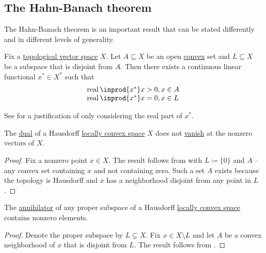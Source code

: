 \subsection{The Hahn-Banach theorem}\label{subsec:hahn_banach}

The Hahn-Banach theorem is an important result that can be stated differently and in different levels of generality.

\begin{theorem}\label{thm:geometric_hahn_banach}\mcite\cite[24]{Йоффе1974}
  Fix a \hyperref[def:topological_vector_space]{topological vector space} \( X \). Let \( A \subseteq X \) be an open \hyperref[def:convex_set]{convex} set and \( L \subseteq X \) be a subspace that is disjoint from \( A \). Then there exists a continuous linear functional \( x^* \in X^* \) such that
  \begin{equation*}
    \begin{array}{l}
      \real \inprod{x^*} x > 0, x \in A \\
      \real \inprod{x^*} x = 0, x \in L
    \end{array}
  \end{equation*}

  See  for a justification of only considering the real part of \( x^* \).
\end{theorem}

\begin{corollary}\label{thm:hahn_banach_implies_functionals_vanish_nowhere}\mcite\cite[24]{Йоффе1974}
  The \hyperref[def:dual_vector_space]{dual} of a Hausdorff \hyperref[def:locally_convex_space]{locally convex space} \( X \) does not \hyperref[def:functions_vanish_nowhere]{vanish} at the nonzero vectors of \( X \).
\end{corollary}
\begin{proof}
  Fix a nonzero point \( x \in X \). The result follows from  with \( L \coloneqq \{ 0 \} \) and \( A \) -- any convex set containing \( x \) and not containing zero. Such a set \( A \) exists because the topology is Hausdorff and \( x \) has a neighborhood disjoint from any point in \( L \).
\end{proof}

\begin{corollary}\label{thm:hahn_banach_implies_annihilator_nontrivial}\mcite\cite[25]{Йоффе1974}
  The \hyperref[def:vector_space_annihilator]{annihilator} of any proper subspace of a Hausdorff \hyperref[def:locally_convex_space]{locally convex space} contains nonzero elements.
\end{corollary}
\begin{proof}
  Denote the proper subspace by \( L \subsetneq X \). Fix \( x \in X \setminus L \) and let \( A \) be a convex neighborhood of \( x \) that is disjoint from \( L \). The result follows from .
\end{proof}


